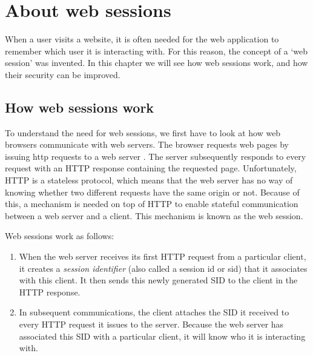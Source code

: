 \chapter{About web sessions}

When a user visits a website, it is often needed for the web application to remember which user it is interacting with. For this reason, the concept of a `web session' was invented. In this chapter we will see how web sessions work, and how their security can be improved.

\section{How web sessions work}\label{session-management}

To understand the need for web sessions, we first have to look at how web browsers communicate with web servers. The browser requests web pages by issuing \gls{http} requests to a web server \cite{Kurose2008}. The server subsequently responds to every request with an HTTP response containing the requested page. Unfortunately, HTTP is a stateless protocol, which means that the web server has no way of knowing whether two different requests have the same origin or not. Because of this, a mechanism is needed on top of HTTP to enable stateful communication between a web server and a client. This mechanism is known as the web session.

Web sessions work as follows:
\begin{enumerate}
	\item When the web server receives its first HTTP request from a particular client, it creates a \emph{session identifier} (also called a \gls{session id} or \gls{sid}) that it associates with this client. It then sends this newly generated SID to the client in the HTTP response.
	\item In subsequent communications, the client attaches the SID it received to every HTTP request it issues to the server. Because the web server has associated this SID with a particular client, it will know who it is interacting with.
\end{enumerate}

